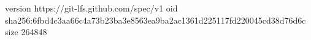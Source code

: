 version https://git-lfs.github.com/spec/v1
oid sha256:6fbd4c3aa66c4a73b23ba3e8563ea9ba2ac1361d225117fd220045cd38d76d6c
size 264848
